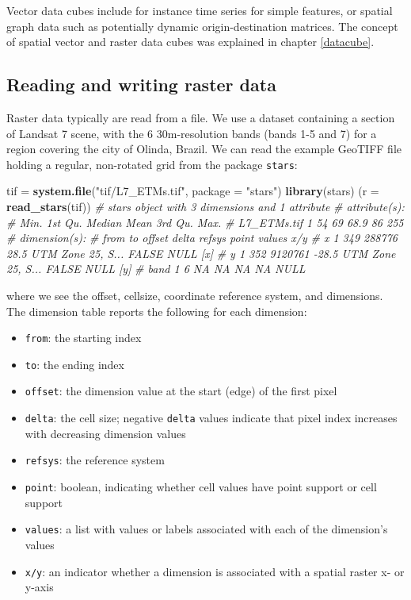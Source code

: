\documentclass[]{book}
\newenvironment{Shaded}{\begin{snugshade}}{\end{snugshade}}
\newcommand{\CommentTok}[1]{\textcolor[rgb]{0.56,0.35,0.01}{\textit{#1}}}
\newcommand{\DataTypeTok}[1]{\textcolor[rgb]{0.13,0.29,0.53}{#1}}
\newcommand{\KeywordTok}[1]{\textcolor[rgb]{0.13,0.29,0.53}{\textbf{#1}}}
\newcommand{\NormalTok}[1]{#1}
\newcommand{\StringTok}[1]{\textcolor[rgb]{0.31,0.60,0.02}{#1}}
\providecommand{\tightlist}{%
  \setlength{\itemsep}{0pt}\setlength{\parskip}{0pt}}
\begin{document}
Vector data cubes include for instance time series for simple
features, or spatial graph data such as potentially dynamic
origin-destination matrices. The concept of spatial vector and
raster data cubes was explained in chapter \ref{datacube}.

\hypertarget{reading-and-writing-raster-data}{%
\subsection{Reading and writing raster data}\label{reading-and-writing-raster-data}}

Raster data typically are read from a file. We use a dataset
containing a section of Landsat 7 scene, with the 6 30m-resolution
bands (bands 1-5 and 7) for a region covering the city of Olinda,
Brazil. We can read the example GeoTIFF file holding a regular,
non-rotated grid from the package \texttt{stars}:

\begin{Shaded}
\begin{Highlighting}[]
\NormalTok{tif =}\StringTok{ }\KeywordTok{system.file}\NormalTok{(}\StringTok{"tif/L7_ETMs.tif"}\NormalTok{, }\DataTypeTok{package =} \StringTok{"stars"}\NormalTok{)}
\KeywordTok{library}\NormalTok{(stars)}
\NormalTok{(}\DataTypeTok{r =} \KeywordTok{read_stars}\NormalTok{(tif))}
\CommentTok{# stars object with 3 dimensions and 1 attribute}
\CommentTok{# attribute(s):}
\CommentTok{#              Min. 1st Qu. Median Mean 3rd Qu. Max.}
\CommentTok{# L7_ETMs.tif     1      54     69 68.9      86  255}
\CommentTok{# dimension(s):}
\CommentTok{#      from  to  offset delta            refsys point values x/y}
\CommentTok{# x       1 349  288776  28.5 UTM Zone 25, S... FALSE   NULL [x]}
\CommentTok{# y       1 352 9120761 -28.5 UTM Zone 25, S... FALSE   NULL [y]}
\CommentTok{# band    1   6      NA    NA                NA    NA   NULL}
\end{Highlighting}
\end{Shaded}

where we see the offset, cellsize, coordinate reference system,
and dimensions. The dimension table reports the following for
each dimension:

\begin{itemize}
\tightlist
\item
  \texttt{from}: the starting index
\item
  \texttt{to}: the ending index
\item
  \texttt{offset}: the dimension value at the start (edge) of the first pixel
\item
  \texttt{delta}: the cell size; negative \texttt{delta} values indicate that pixel index increases with decreasing dimension values
\item
  \texttt{refsys}: the reference system
\item
  \texttt{point}: boolean, indicating whether cell values have point support or cell support
\item
  \texttt{values}: a list with values or labels associated with each of the dimension's values
\item
  \texttt{x/y}: an indicator whether a dimension is associated with a spatial raster x- or y-axis
\end{itemize}
\end{document}
